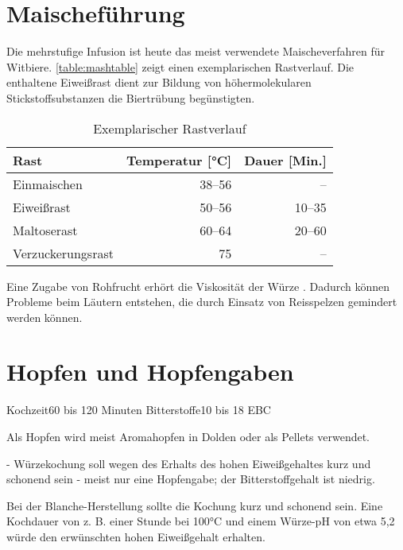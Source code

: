 \documentclass[a4paper,parskip=half]{scrartcl}
\begin{document}
\section*{Maischeführung}

Die mehrstufige Infusion ist heute das meist verwendete Maischeverfahren
für Witbiere. \autoref{table:mashtable}
zeigt einen exemplarischen Rastverlauf. Die enthaltene
Eiweißrast dient zur Bildung von höhermolekularen Stickstoffsubstanzen die
Biertrübung begünstigten. \parencite[12,16]{Strottner1999}

\begin{table}[H]
\centering
\begin{tabular}{lrr}
\toprule
Rast              & Temperatur [°C] & Dauer [Min.] \\
\midrule
Einmaischen       & 38–56          & –     \\
Eiweißrast        & 50–56          & 10–35 \\
Maltoserast       & 60–64          & 20–60 \\
Verzuckerungsrast & 75              & –     \\
\bottomrule
\end{tabular}
\caption{Exemplarischer Rastverlauf \parencite[16]{Strottner1999}}
\label{table:mashtable}
\end{table}

Eine Zugabe von Rohfrucht erhört die Viskosität der Würze \parencite[9]{Strottner1999}.
Dadurch können Probleme beim Läutern entstehen, die durch Einsatz von
Reisspelzen gemindert werden können.

\section*{Hopfen und Hopfengaben}

\parencite[13]{Strottner1999}
Kochzeit60 bis 120 Minuten
Bitterstoffe10 bis 18 EBC

\parencite[1]{Strottner1999}
Als Hopfen wird meist
Aromahopfen in Dolden oder als Pellets verwendet.


\parencite[2]{Strottner1999}
- Würzekochung soll wegen des Erhalts des hohen Eiweißgehaltes kurz und schonend sein
- meist nur eine Hopfengabe; der Bitterstoffgehalt ist niedrig.

\parencite[17]{Strottner1999}
Bei der Blanche-Herstellung sollte die Kochung kurz und schonend sein. Eine
Kochdauer von z. B. einer Stunde bei 100°C und einem Würze-pH von etwa 5,2
würde den erwünschten hohen Eiweißgehalt erhalten.
\end{document}
